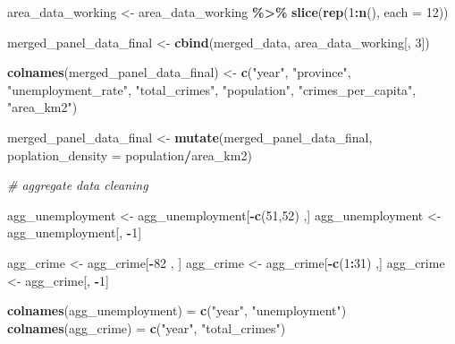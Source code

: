 \documentclass[
]{article}
\newenvironment{Shaded}{\begin{snugshade}}{\end{snugshade}}
\newcommand{\AttributeTok}[1]{\textcolor[rgb]{0.13,0.29,0.53}{#1}}
\newcommand{\CommentTok}[1]{\textcolor[rgb]{0.56,0.35,0.01}{\textit{#1}}}
\newcommand{\DecValTok}[1]{\textcolor[rgb]{0.00,0.00,0.81}{#1}}
\newcommand{\FunctionTok}[1]{\textcolor[rgb]{0.13,0.29,0.53}{\textbf{#1}}}
\newcommand{\NormalTok}[1]{#1}
\newcommand{\OtherTok}[1]{\textcolor[rgb]{0.56,0.35,0.01}{#1}}
\newcommand{\SpecialCharTok}[1]{\textcolor[rgb]{0.81,0.36,0.00}{\textbf{#1}}}
\newcommand{\StringTok}[1]{\textcolor[rgb]{0.31,0.60,0.02}{#1}}
\begin{document}
\begin{Shaded}
\begin{Highlighting}[]
\NormalTok{area\_data\_working }\OtherTok{\textless{}{-}}\NormalTok{ area\_data\_working }\SpecialCharTok{\%\textgreater{}\%}
  \FunctionTok{slice}\NormalTok{(}\FunctionTok{rep}\NormalTok{(}\DecValTok{1}\SpecialCharTok{:}\FunctionTok{n}\NormalTok{(), }\AttributeTok{each =} \DecValTok{12}\NormalTok{))}

\NormalTok{merged\_panel\_data\_final }\OtherTok{\textless{}{-}} \FunctionTok{cbind}\NormalTok{(merged\_data, area\_data\_working[, }\DecValTok{3}\NormalTok{])}

\FunctionTok{colnames}\NormalTok{(merged\_panel\_data\_final) }\OtherTok{\textless{}{-}} \FunctionTok{c}\NormalTok{(}\StringTok{"year"}\NormalTok{, }\StringTok{"province"}\NormalTok{, }\StringTok{"unemployment\_rate"}\NormalTok{, }\StringTok{"total\_crimes"}\NormalTok{, }\StringTok{"population"}\NormalTok{, }\StringTok{"crimes\_per\_capita"}\NormalTok{, }\StringTok{"area\_km2"}\NormalTok{)}

\NormalTok{merged\_panel\_data\_final }\OtherTok{\textless{}{-}} \FunctionTok{mutate}\NormalTok{(merged\_panel\_data\_final, }\AttributeTok{poplation\_density =}\NormalTok{ population}\SpecialCharTok{/}\NormalTok{area\_km2)}

\CommentTok{\# aggregate data cleaning}

\NormalTok{agg\_unemployment }\OtherTok{\textless{}{-}}\NormalTok{ agg\_unemployment[}\SpecialCharTok{{-}}\FunctionTok{c}\NormalTok{(}\DecValTok{51}\NormalTok{,}\DecValTok{52}\NormalTok{) ,]}
\NormalTok{agg\_unemployment }\OtherTok{\textless{}{-}}\NormalTok{ agg\_unemployment[, }\SpecialCharTok{{-}}\DecValTok{1}\NormalTok{]}

\NormalTok{agg\_crime }\OtherTok{\textless{}{-}}\NormalTok{ agg\_crime[}\SpecialCharTok{{-}}\DecValTok{82}\NormalTok{ , ]}
\NormalTok{agg\_crime }\OtherTok{\textless{}{-}}\NormalTok{ agg\_crime[}\SpecialCharTok{{-}}\FunctionTok{c}\NormalTok{(}\DecValTok{1}\SpecialCharTok{:}\DecValTok{31}\NormalTok{) ,]}
\NormalTok{agg\_crime }\OtherTok{\textless{}{-}}\NormalTok{ agg\_crime[, }\SpecialCharTok{{-}}\DecValTok{1}\NormalTok{]}

\FunctionTok{colnames}\NormalTok{(agg\_unemployment) }\OtherTok{=} \FunctionTok{c}\NormalTok{(}\StringTok{"year"}\NormalTok{, }\StringTok{"unemployment"}\NormalTok{)}
\FunctionTok{colnames}\NormalTok{(agg\_crime) }\OtherTok{=} \FunctionTok{c}\NormalTok{(}\StringTok{"year"}\NormalTok{, }\StringTok{"total\_crimes"}\NormalTok{)}


\end{Highlighting}
\end{Shaded}
\end{document}
